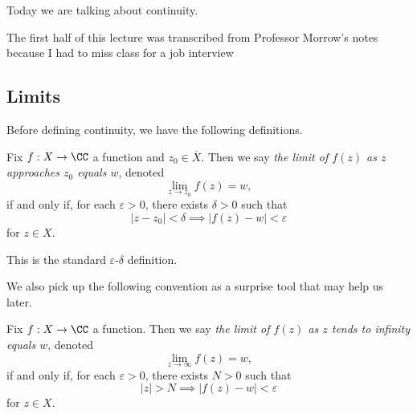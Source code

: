 
Today we are talking about continuity.
\begin{warn}
	The first half of this lecture was transcribed from Professor Morrow's notes because I had to miss class for a job interview
\end{warn}

\subsection{Limits}
Before defining continuity, we have the following definitions.
\begin{definition}[Limit]
	Fix $f:X\to\CC$ a function and $z_0\in\overline X$. Then we say \textit{the limit of $f(z)$ as $z$ approaches $z_0$ equals $w$}, denoted
	\[\lim_{z\to z_0}f(z)=w,\]
	if and only if, for each $\varepsilon>0$, there exists $\delta>0$ such that
	\[|z-z_0|<\delta\implies|f(z)-w|<\varepsilon\]
	for $z\in X$.
\end{definition}
This is the standard $\varepsilon$-$\delta$ definition.

We also pick up the following convention as a surprise tool that may help us later.
\begin{definition}
	Fix $f:X\to\CC$ a function. Then we say \textit{the limit of $f(z)$ as $z$ tends to infinity equals $w$}, denoted
	\[\lim_{z\to\infty}f(z)=w,\]
	if and only if, for each $\varepsilon>0$, there exists $N>0$ such that
	\[|z|>N\implies|f(z)-w|<\varepsilon\]
	for $z\in X$.
\end{definition}

